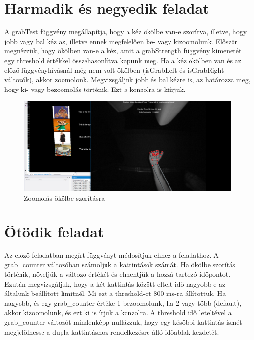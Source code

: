 \section{Harmadik és negyedik feladat}
A grabTest függvény megállapítja, hogy a kéz ökölbe van-e szorítva, illetve, hogy jobb vagy bal kéz az, illetve ennek megfelelően be- vagy kizoomolunk. Először megnézzük, hogy ökölben van-e a kéz, amit a grabStrength függvény kimenetét egy threshold értékkel összehasonlítva kapunk meg. Ha a kéz ökölben van és az előző függvényhívásnál még nem volt ökölben (isGrabLeft és isGrabRight változók), akkor zoomolonk. Megvizsgáljuk jobb és bal kézre is, az határozza meg, hogy ki- vagy bezoomolás történik. Ezt a konzolra is kiírjuk.


\begin{figure}[!ht]
	\includegraphics[width=150mm,keepaspectratio]{figures/m10/3.png}
	\caption{Zoomolás ökölbe szorításra}
\end{figure}

\section{Ötödik feladat}
Az előző feladatban megírt függvényt módosítjuk ehhez a feladathoz. A grab\_counter változóban számoljuk a kattintások számát. Ha ökölbe szorítás történik, növeljük a változó értékét és elmentjük a hozzá tartozó időpontot. Ezután megvizsgáljuk, hogy a két kattintás között eltelt idő nagyobb-e az általunk beállított limitnél. Mi ezt a threshold-ot 800 ms-ra állítottuk. Ha nagyobb, és egy grab\_counter értéke 1 bezoomolunk, ha 2 vagy több (default), akkor kizoomolunk, és ezt ki is írjuk a konzolra. A threshold idő leteltével a grab\_counter változót mindenképp nullázzuk, hogy egy későbbi kattintás ismét megjelölhesse a dupla kattintáshoz rendelkezésre álló időablak kezdetét.


